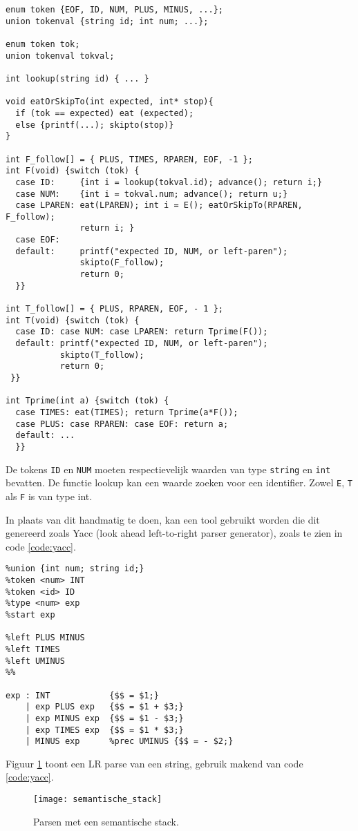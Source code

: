 \begin{lstlisting}[caption={Recursive-descent parser voor grammatica \ref{grammar_3_15}.},label={code:recursive_descent_parser_grammar315},captionpos=b]
enum token {EOF, ID, NUM, PLUS, MINUS, ...};
union tokenval {string id; int num; ...};

enum token tok;
union tokenval tokval;

int lookup(string id) { ... }

void eatOrSkipTo(int expected, int* stop){
  if (tok == expected) eat (expected);
  else {printf(...); skipto(stop)}
}

int F_follow[] = { PLUS, TIMES, RPAREN, EOF, -1 };
int F(void) {switch (tok) {
  case ID:     {int i = lookup(tokval.id); advance(); return i;}
  case NUM:    {int i = tokval.num; advance(); return u;}
  case LPAREN: eat(LPAREN); int i = E(); eatOrSkipTo(RPAREN, F_follow); 
               return i; }
  case EOF:
  default:     printf("expected ID, NUM, or left-paren");
               skipto(F_follow);
               return 0;
  }}

int T_follow[] = { PLUS, RPAREN, EOF, - 1 };
int T(void) {switch (tok) {
  case ID: case NUM: case LPAREN: return Tprime(F());
  default: printf("expected ID, NUM, or left-paren");
           skipto(T_follow);
           return 0;
 }}
 
int Tprime(int a) {switch (tok) {
  case TIMES: eat(TIMES); return Tprime(a*F());
  case PLUS: case RPAREN: case EOF: return a;
  default: ...
  }}
\end{lstlisting}

De tokens \texttt{ID} en \texttt{NUM} moeten respectievelijk waarden van type \texttt{string} en \texttt{int} bevatten. De functie lookup kan een waarde zoeken voor een identifier. Zowel \texttt{E}, \texttt{T} als \texttt{F} is van type int.

In plaats van dit handmatig te doen, kan een tool gebruikt worden die dit genereerd zoals Yacc (look ahead left-to-right parser generator), zoals te zien in code \ref{code:yacc}.
\begin{lstlisting}[caption={Yacc.},captionpos=b,label={code:yacc}]
%{ declarations of yylex  and yyerror %}
%union {int num; string id;}
%token <num> INT
%token <id> ID
%type <num> exp
%start exp

%left PLUS MINUS
%left TIMES
%left UMINUS
%%

exp : INT            {$$ = $1;}
    | exp PLUS exp   {$$ = $1 + $3;}
    | exp MINUS exp  {$$ = $1 - $3;}
    | exp TIMES exp  {$$ = $1 * $3;}
    | MINUS exp      %prec UMINUS {$$ = - $2;}
\end{lstlisting}
Figuur \ref{fig:semantische_stack} toont een LR parse van een string, gebruik makend van code \ref{code:yacc}.
\begin{figure}[h]
	\texttt{[image: semantische\_stack]}
	\caption{Parsen met een semantische stack.}
	\label{fig:semantische_stack}
\end{figure}

